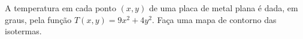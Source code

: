 \begin{frame}[label=funcoes]
\begin{exe}
		A temperatura em cada ponto $(x,y)$ de uma placa de metal plana é dada, em graus, pela função $T(x,y)=9x^2+4y^2$. Faça uma mapa de contorno das isotermas.
\end{exe}
\end{frame}



\begin{frame}[label=funcoes]
\begin{center}

\end{center}
\end{frame}
